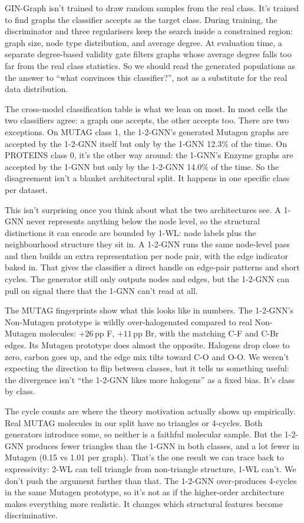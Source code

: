 \documentclass[12pt,a4paper]{article}
\begin{document}
GIN-Graph isn't trained to draw random samples from the real class. It's trained to find graphs the classifier accepts as the target class. During training, the discriminator and three regularisers keep the search inside a constrained region: graph size, node type distribution, and average degree. At evaluation time, a separate degree-based validity gate filters graphs whose average degree falls too far from the real class statistics. So we should read the generated populations as the answer to ``what convinces this classifier?'', not as a substitute for the real data distribution.

The cross-model classification table is what we lean on most. In most cells the two classifiers agree: a graph one accepts, the other accepts too. There are two exceptions. On MUTAG class 1, the 1-2-GNN's generated Mutagen graphs are accepted by the 1-2-GNN itself but only by the 1-GNN 12.3\% of the time. On PROTEINS class 0, it's the other way around: the 1-GNN's Enzyme graphs are accepted by the 1-GNN but only by the 1-2-GNN 14.0\% of the time. So the disagreement isn't a blanket architectural split. It happens in one specific class per dataset.

This isn't surprising once you think about what the two architectures see. A 1-GNN never represents anything below the node level, so the structural distinctions it can encode are bounded by 1-WL: node labels plus the neighbourhood structure they sit in. A 1-2-GNN runs the same node-level pass and then builds an extra representation per node pair, with the edge indicator baked in. That gives the classifier a direct handle on edge-pair patterns and short cycles. The generator still only outputs nodes and edges, but the 1-2-GNN can pull on signal there that the 1-GNN can't read at all.

The MUTAG fingerprints show what this looks like in numbers. The 1-2-GNN's Non-Mutagen prototype is wildly over-halogenated compared to real Non-Mutagen molecules: $+26$\,pp F, $+11$\,pp Br, with the matching C-F and C-Br edges. Its Mutagen prototype does almost the opposite. Halogens drop close to zero, carbon goes up, and the edge mix tilts toward C-O and O-O. We weren't expecting the direction to flip between classes, but it tells us something useful: the divergence isn't ``the 1-2-GNN likes more halogens'' as a fixed bias. It's class by class.

The cycle counts are where the theory motivation actually shows up empirically. Real MUTAG molecules in our split have no triangles or 4-cycles. Both generators introduce some, so neither is a faithful molecular sample. But the 1-2-GNN produces fewer triangles than the 1-GNN in both classes, and a lot fewer in Mutagen (0.15 vs 1.01 per graph). That's the one result we can trace back to expressivity: 2-WL can tell triangle from non-triangle structure, 1-WL can't. We don't push the argument further than that. The 1-2-GNN over-produces 4-cycles in the same Mutagen prototype, so it's not as if the higher-order architecture makes everything more realistic. It changes which structural features become discriminative.
\end{document}
